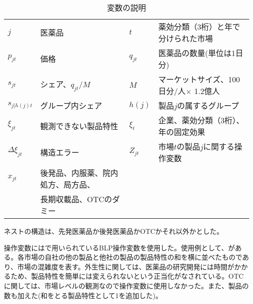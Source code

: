 \documentclass[a4paper,11pt,uplatex]{jsarticle}
\theoremstyle{definition}
\begin{document}
\begin{table}[H]\centering \caption{変数の説明}
    \small
    \begin{tabular}{llll}
        \toprule \label{tab:demand_}
        \(j\) & 医薬品&$t$ &薬効分類（3桁）と年で分けられた市場 \\
        $p_{jt}$ &価格 & $q_{jt}$ &医薬品の数量(単位は1日分)\\ 
        $s_{jt}$ &シェア、$q_{jt}/M$ & $M$ &マーケットサイズ、100日分/人$\times$ 1.2億人\\
        $s_{j|h(j)t}$ & グループ内シェア & $h(j)$ &製品\(j\)の属するグループ\\
        $\xi_{jt}$ & 観測できない製品特性& $\xi_t$ &企業、薬効分類（3桁）、年の固定効果 \\
        $\Delta \xi_{jt}$ & 構造エラー &$Z_{jt}$ &市場\(t\)の製品\(j\)に関する操作変数 \\
        $x_{jt}$ & 後発品、内服薬、院内処方、局方品、& &  \\
         & 長期収載品、OTCのダミー & &\\
         \bottomrule
    \end{tabular}
\end{table}
ネストの構造は、先発医薬品か後発医薬品かOTCかそれ以外かとした。

操作変数には\cite{BLP}で用いられているBLP操作変数を使用した。使用例として、\cite{Iizuka2007}がある。各市場の自社の他の製品と他社の製品の製品特性の和を横に並べたものであり、市場の混雑度を表す。外生性に関しては、医薬品の研究開発には時間がかかるため、製品特性を簡単には変えられないという正当化がなされている。OTCに関しては、市場レベルの観測なので操作変数に使用しなかった。また、製品の数も加えた(和をとる製品特性として1を追加した)。
\end{document}
